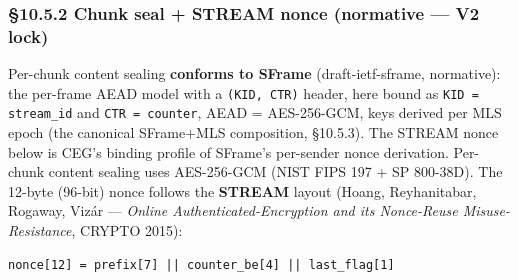 \documentclass[10pt]{article}
\begin{document}
\subsubsection*{§10.5.2 Chunk seal + STREAM nonce (normative — V2 lock)}


Per-chunk content sealing \textbf{conforms to SFrame} (draft-ietf-sframe, normative): the per-frame AEAD model with a \texttt{(KID, CTR)} header, here bound as \texttt{KID = stream\_id} and \texttt{CTR = counter}, AEAD = AES-256-GCM, keys derived per MLS epoch (the canonical SFrame+MLS composition, §10.5.3). The STREAM nonce below is CEG's binding profile of SFrame's per-sender nonce derivation. Per-chunk content sealing uses AES-256-GCM (NIST FIPS 197 + SP 800-38D). The 12-byte (96-bit) nonce follows the \textbf{STREAM} layout (Hoang, Reyhanitabar, Rogaway, Vizár — \textit{Online Authenticated-Encryption and its Nonce-Reuse Misuse-Resistance}, CRYPTO 2015):


\begin{lstlisting}
nonce[12] = prefix[7] || counter_be[4] || last_flag[1]
\end{lstlisting}
\end{document}

